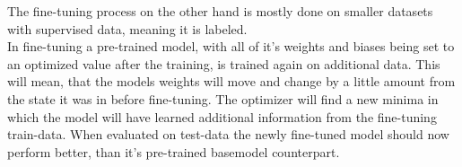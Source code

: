 \documentclass{article}
\begin{document}
The fine-tuning process on the other hand is mostly done on smaller datasets 
with supervised data, meaning it is labeled.
\\[2em]
In fine-tuning a pre-trained model, with all of it's weights and biases being 
set to an optimized value after the training, is trained again on additional 
data. This will mean, that the models weights will move and change by a little 
amount from the state it was in before fine-tuning. The optimizer will find a 
new minima in which the model will have learned additional information from the 
fine-tuning train-data. When evaluated on test-data the newly fine-tuned model 
should now perform better, than it's pre-trained basemodel counterpart.

\newpage
\printbibliography[heading=bibintoc]
\end{document}
